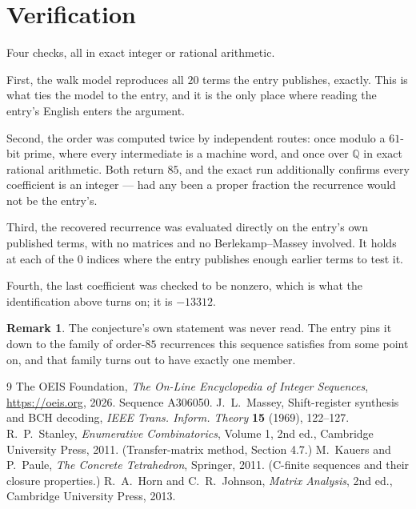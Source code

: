 \documentclass[11pt,a4paper]{article}
\theoremstyle{plain}
\theoremstyle{definition}
\newtheorem{remark}[theorem]{Remark}
\begin{document}
\section{Verification}

Four checks, all in exact integer or rational arithmetic.

First, the walk model reproduces all $20$ terms the entry publishes, exactly. This is
what ties the model to the entry, and it is the only place where reading the entry's English
enters the argument.

Second, the order was computed twice by independent routes: once modulo a $61$-bit prime, where
every intermediate is a machine word, and once over $\mathbb{Q}$ in exact rational arithmetic.
Both return $85$, and the exact run additionally confirms every coefficient is an integer
--- had any been a proper fraction the recurrence would not be the entry's.

Third, the recovered recurrence was evaluated directly on the entry's own published terms, with
no matrices and no Berlekamp--Massey involved. It holds at each of the $0$ indices where
the entry publishes enough earlier terms to test it.

Fourth, the last coefficient was checked to be nonzero, which is what the identification above
turns on; it is $-13312$.

\begin{remark}
The conjecture's own statement was never read. The entry pins it down to the family of
order-$85$ recurrences this sequence satisfies from some point on, and that family turns
out to have exactly one member.
\end{remark}

\begin{thebibliography}{9}
 The OEIS Foundation, \emph{The On-Line Encyclopedia of Integer
Sequences}, \url{https://oeis.org}, 2026. Sequence A306050.
 J.~L.~Massey, Shift-register synthesis and BCH decoding, \emph{IEEE
Trans. Inform. Theory} \textbf{15} (1969), 122--127.
 R.~P.~Stanley, \emph{Enumerative Combinatorics}, Volume 1, 2nd ed.,
Cambridge University Press, 2011. (Transfer-matrix method, Section 4.7.)
 M.~Kauers and P.~Paule, \emph{The Concrete Tetrahedron}, Springer, 2011.
(C-finite sequences and their closure properties.)
 R.~A.~Horn and C.~R.~Johnson, \emph{Matrix Analysis}, 2nd ed., Cambridge
University Press, 2013.
\end{thebibliography}
\end{document}
